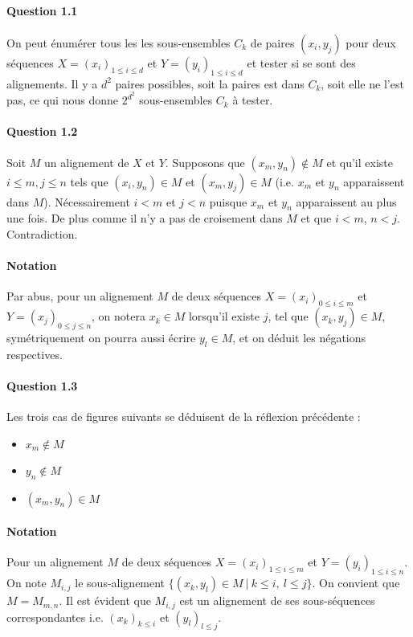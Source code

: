 \paragraph{Question 1.1}
On peut \'enum\'erer tous les les sous-ensembles $C_k$ de paires
$(x_i,y_j)$ pour deux s\'equences $X=(x_i)_{1\leq i\leq d}$ et
$Y=(y_i)_{1\leq i\leq d}$ et tester si se sont des alignements. Il y a
$d^2$ paires possibles, soit la paires est dans $C_k$, soit elle ne
l'est pas, ce qui nous donne $2^{d^2}$ sous-ensembles $C_k$ à tester.
\paragraph{Question 1.2}
Soit $M$ un alignement de $X$ et $Y$. Supposons que $(x_m,y_n)\not\in M$
et qu'il existe $i\leq m, j\leq n$ tels que $(x_i,y_n)\in M$ et
$(x_m,y_j)\in M$ (i.e. $x_m$ et $y_n$ apparaissent dans
$M$). N\'ecessairement $i<m$ et $j<n$ puisque $x_m$ et $y_n$
apparaissent au plus une fois. De plus comme il n'y a pas de
croisement dans $M$ et que $i<m$, $n<j$. Contradiction.
\paragraph{Notation}
Par abus, pour un alignement $M$ de deux s\'equences 
$X=(x_i)_{0\leq i\leq m}$ et $Y=(x_j)_{0\leq j\leq n}$,
on notera $x_k\in M$ lorsqu'il existe $j$, tel que $(x_k,y_j)\in M$,
sym\'etriquement on pourra aussi \'ecrire $y_l\in M$, et on d\'eduit les
n\'egations respectives.
\paragraph{Question 1.3}
Les trois cas de figures suivants se d\'eduisent de la r\'eflexion
pr\'ec\'edente :
\begin{itemize}
\item $x_m\not\in M$
\item $y_n\not\in M$
\item $(x_m,y_n)\in M$
\end{itemize}
\paragraph{Notation}
Pour un alignement $M$ de deux s\'equences $X=(x_i)_{1\leq i\leq m}$
et $Y=(y_i)_{1\leq i\leq n}$. On note $M_{i,j}$ le sous-alignement
$\Big\{(x_k,y_l)\in M\ |\ k\leq i,\ l\leq j\Big\}$. On convient que
$M=M_{m,n}$. Il est \'evident que $M_{i,j}$ est un alignement de ses
sous-s\'equences correspondantes i.e. $(x_k)_{k\leq i}$ et
$(y_l)_{l\leq j}$.
